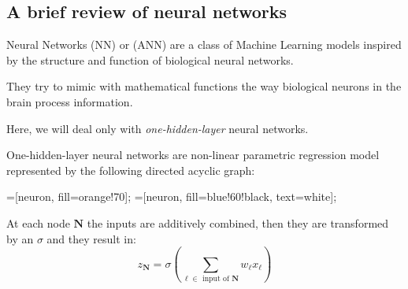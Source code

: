 \subsection{A brief review of neural networks}

\begin{definition}{Neural Networks}{} (NN) or  (ANN)
	are a class of Machine Learning models inspired by the structure and function of biological
	neural networks.

	They try to mimic with mathematical functions the way biological neurons
	in the brain process information.

	\tcblower

	Here, we will deal only with \emph{one-hidden-layer} neural networks.
\end{definition}

\begin{definition}{One-hidden-layer neural networks}{}
	are non-linear parametric regression model represented by the following
	directed acyclic graph:

	\begin{center}
		\begin{neuralnetwork}[height=5]
			=[neuron, fill=orange!70];
			=[neuron, fill=blue!60!black, text=white];


			\hiddenlayer[count=3, bias=false, title=Hidden Layer]
			\linklayers

			\outputlayer[count=3, title=Output Layer]
			\linklayers
		\end{neuralnetwork}
	\end{center}

	At each node $\boldsymbol N$ the inputs are additively combined, then
	they are transformed by an  $\sigma$ and they
	result in:
	\begin{equation*}
		z_{\boldsymbol N} = \sigma \left( \sum_{\ell \in \text{ input of } \boldsymbol N} w_\ell x_\ell \right)
	\end{equation*}

\end{definition}

